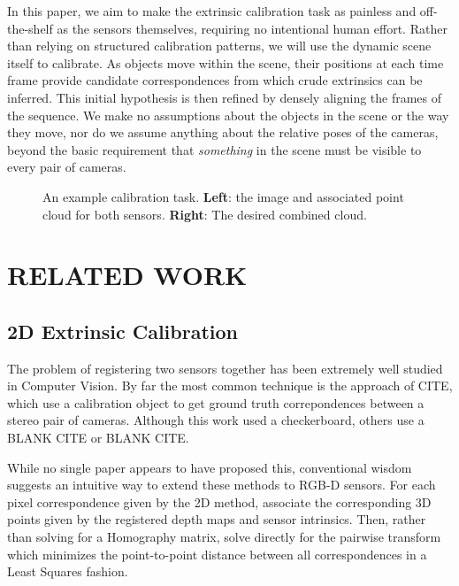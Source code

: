 \documentclass[letterpaper, 10 pt, conference]{ieeeconf}  %
\begin{document}
In this paper, we aim to make the extrinsic calibration task as painless and off-the-shelf as the sensors themselves, 
requiring no intentional human effort. Rather than relying on structured calibration patterns, 
we will use the dynamic scene itself to calibrate. As objects move within the scene, their positions at each time frame 
provide candidate correspondences from which crude extrinsics can be inferred. 
This initial hypothesis is then refined by densely aligning the frames of the sequence. 
We make no assumptions about the objects in the scene or the way they move, nor do we assume anything 
about the relative poses of the cameras, beyond the basic requirement that \emph{something} in the scene must be visible to every pair of cameras.


\begin{figure*}
  \centering
  \caption{An example calibration task. \textbf{Left}: the image and associated point cloud for both sensors. \textbf{Right}: The desired combined cloud.}
  \label{fig:example_alignment}
\end{figure*}

\section{RELATED WORK}

\subsection{2D Extrinsic Calibration}
The problem of registering two sensors together has been extremely well studied in Computer Vision. 
By far the most common technique is the approach of CITE, which use a calibration object to get ground 
truth correpondences between a stereo pair of cameras. Although this work used a checkerboard, others use 
a BLANK CITE or BLANK CITE. 

While no single paper appears to have proposed this, conventional wisdom suggests an 
intuitive way to extend these methods to RGB-D sensors. For each pixel correspondence given by the 2D method, 
associate the corresponding 3D points given by the registered depth maps and sensor intrinsics. Then, rather than 
solving for a Homography matrix, solve directly for the pairwise transform which minimizes the point-to-point 
distance between all correspondences in a Least Squares fashion. %
\end{document}

